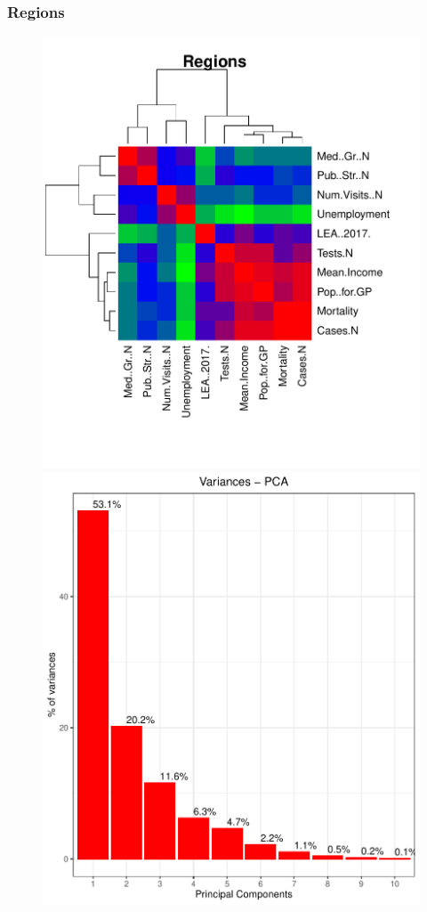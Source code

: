 \documentclass[compress]{beamer}
\begin{document}
\begin{frame}
\frametitle{Regions}

\begin{figure}[H]
\centering
\begin{minipage}{.6\textwidth}
  \centering
  \includegraphics[width=\linewidth, ]{Pic/Regions_CorrMatrix.pdf}
\end{minipage}%
\begin{minipage}{.3\textwidth}
  \centering
  \includegraphics[width=\linewidth,]{Pic/Region_variances.pdf}

\end{minipage}
\end{figure}
\end{frame}
\end{document}
